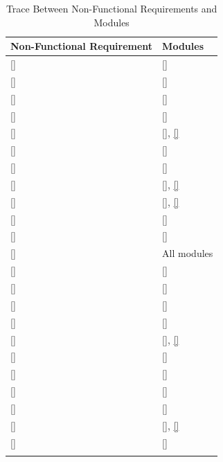 \documentclass[12pt, titlepage]{article}
\newcommand{\descriptiveid}[1]{{\noexpandarg\StrSubstitute{#1}{_}{\textunderscore\allowbreak}[\idtmp]\texttt{\idtmp}}}
\newcommand{\idref}[1]{\hyperref[#1]{\descriptiveid{#1}}}
\newcommand{\srsurl}{https://ayushpatel2026.github.io/Keystone/SRS/SRS.pdf}
\newcommand{\srsref}[1]{\href{\srsurl\#nameddest=#1}{\descriptiveid{#1}}}
\begin{document}
\begin{longtable}{p{} p{}}

  \toprule
  Non-Functional Requirement & Modules \\
  \midrule
  \srsref{NFR_ScreenSize} & \idref{M_UserInterface} \\ \hline
  \srsref{NFR_UsabilityFirstSuccess} & \idref{M_UserInterface} \\ \hline
  \srsref{NFR_LearnUnassisted} & \idref{M_UserInterface} \\ \hline
  \srsref{NFR_AccessibilityWCAG} & \idref{M_UserInterface} \\ \hline
  \srsref{NFR_PerfTail} & \idref{M_HardwareHiding}, \idref{M_Persistence} \\ \hline
  \srsref{NFR_Uptime} & \idref{M_HardwareHiding} \\ \hline
  \srsref{NFR_Recoverable} & \idref{M_Persistence} \\ \hline
  \srsref{NFR_PeakUsers} & \idref{M_HardwareHiding}, \idref{M_Persistence} \\ \hline
  \srsref{NFR_Browsers} & \idref{M_HardwareHiding}, \idref{M_UserInterface} \\ \hline
  \srsref{NFR_Container} & \idref{M_HardwareHiding} \\ \hline
  \srsref{NFR_DeployUnassisted} & \idref{M_HardwareHiding} \\ \hline
  \srsref{NFR_ChangeEffort} & All modules \\ \hline
  \srsref{NFR_LiveDisable} & \idref{M_CourseManagement} \\ \hline
  \srsref{NFR_Authenticate} & \idref{M_Authentication} \\ \hline
  \srsref{NFR_Authorize} & \idref{M_Authorization} \\ \hline
  \srsref{NFR_ConcurrencySafety} & \idref{M_Persistence} \\ \hline
  \srsref{NFR_EssentialPersonal} & \idref{M_StudentsTeams}, \idref{M_Authentication} \\ \hline
  \srsref{NFR_EncryptTransit} & \idref{M_HardwareHiding} \\ \hline
  \srsref{NFR_EncryptRest} & \idref{M_Persistence} \\ \hline
  \srsref{NFR_PasswordHash} & \idref{M_Authentication} \\ \hline
  \srsref{NFR_AuditLog} & \idref{M_AuditLog} \\ \hline
  \srsref{NFR_AuditTamper} & \idref{M_AuditLog}, \idref{M_Notifications} \\ \hline
  \srsref{NFR_ComplianceAODA} & \idref{M_UserInterface} \\ \hline

  \bottomrule

  \caption{Trace Between Non-Functional Requirements and Modules}
  \label{TblNFRT}
\end{longtable}
\end{document}
